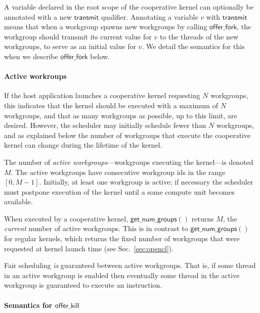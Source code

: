 \documentclass[numbers,nocopyrightspace,10pt]{sigplanconf}
\newcommand{\mysec}{Sec.~}
\newcommand{\transmit}{\mathsf{transmit}}
\newcommand{\offerfork}{\mathsf{offer\_fork}}
\newcommand{\offerkill}{\mathsf{offer\_kill}}
\newcommand{\getnumgroups}{\mathsf{get\_num\_groups}}
\begin{document}
A variable declared in the root scope of the cooperative kernel can
optionally be annotated with a new $\transmit$ qualifier.  Annotating
a variable $v$ with $\transmit$ means that when a workgroup spawns new
workgroups by calling $\offerfork$, the workgroup should transmit its
current value for $v$ to the threads of the new workgroups, to serve
as an initial value for $v$.  We detail the semantics for this when we
describe $\offerfork$ below.

\paragraph{Active workroups}

If the host application launches a cooperative kernel requesting $N$
workgroups, this indicates that the kernel should be executed with a
maximum of $N$ workgroups, and that as many workgroups as possible, up
to this limit, are desired.  However, the scheduler may initially
schedule fewer than $N$ workgroups, and as explained below the number
of workgroups that execute the cooperative kernel can change during
the lifetime of the kernel.

The number of \emph{active workgroups}---workgroups executing the
kernel---is denoted $M$.  The active workgroups
have consecutive workgroup ids in the range $[0, M-1]$.
Initially, at least one workgroup is active;
if necessary the scheduler must postpone execution of the kernel until
a some compute unit becomes available.  

When executed by a cooperative
kernel, $\getnumgroups()$ returns $M$, the \emph{current} number of
active workgroups.  This is in contrast to $\getnumgroups()$ for
regular kernels, which returns the fixed number of workgroups that
were requested at kernel launch time (see \mysec\ref{sec:opencl}).

Fair scheduling \emph{is} guaranteed between active workgroups.  That is, if
some thread in an active workgroup is enabled then eventually some
thread in the active workgroup is guaranteed to execute an
instruction.


\paragraph{Semantics for $\offerkill$}
\end{document}
